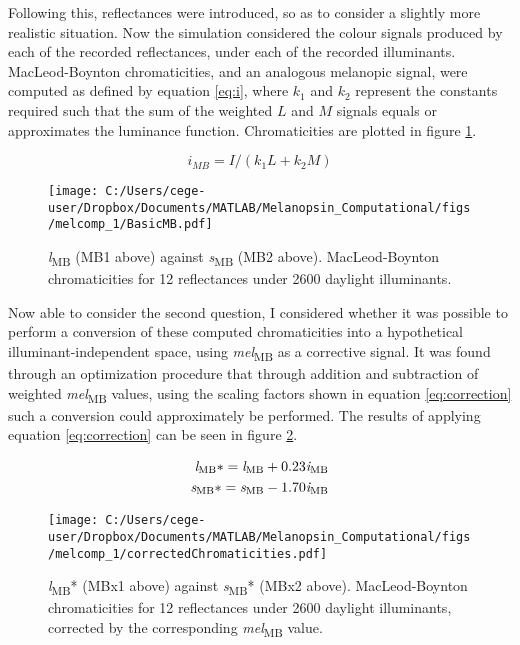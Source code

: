 \documentclass{article}
\begin{document}
Following this, reflectances were introduced, so as to consider a slightly more realistic situation. Now the simulation considered the colour signals produced by each of the recorded reflectances, under each of the recorded illuminants. MacLeod-Boynton chromaticities, and an analogous melanopic signal, were computed as defined by equation \ref{eq:i}, where $k_1$ and $k_2$ represent the constants required such that the sum of the weighted $L$ and $M$ signals equals or approximates the luminance function. Chromaticities are plotted in figure \ref{fig:mb}.


\begin{equation} \label{eq:i}
i_{MB} = I/(k_1L + k_2M) 
\end{equation}


\begin{figure}[ht]
    \centering
    \texttt{[image: C:/Users/cege-user/Dropbox/Documents/MATLAB/Melanopsin\_Computational/figs/melcomp\_1/BasicMB.pdf]}
    \caption{\textit{l}\textsubscript{MB} (MB1 above) against \textit{s}\textsubscript{MB} (MB2 above). MacLeod-Boynton chromaticities for 12 reflectances under 2600 daylight illuminants.}
    \label{fig:mb}
\end{figure} 

Now able to consider the second question, I considered whether it was possible to perform a conversion of these computed chromaticities into a hypothetical illuminant-independent space, using \textit{mel}\textsubscript{MB} as a corrective signal. It was found through an optimization procedure that through addition and subtraction of weighted \textit{mel}\textsubscript{MB} values, using the scaling factors shown in equation \ref{eq:correction} such a conversion could approximately be performed. The results of applying equation \ref{eq:correction} can be seen in figure \ref{fig:corrected}.

\begin{subequations} \label{eq:correction}
\begin{align}
\textit{l}\textsubscript{MB}* = \textit{l}\textsubscript{MB} + 0.23\textit{i}\textsubscript{MB}\\
\textit{s}\textsubscript{MB}* = \textit{s}\textsubscript{MB} - 1.70\textit{i}\textsubscript{MB}
\end{align}
\end{subequations}

\begin{figure}[ht]
    \centering
    \texttt{[image: C:/Users/cege-user/Dropbox/Documents/MATLAB/Melanopsin\_Computational/figs/melcomp\_1/correctedChromaticities.pdf]}
    \caption{\textit{l}\textsubscript{MB}* (MBx1 above) against \textit{s}\textsubscript{MB}* (MBx2 above). MacLeod-Boynton chromaticities for 12 reflectances under 2600 daylight illuminants, corrected by the corresponding \textit{mel}\textsubscript{MB} value.}
    \label{fig:corrected}
\end{figure} 
\end{document}
